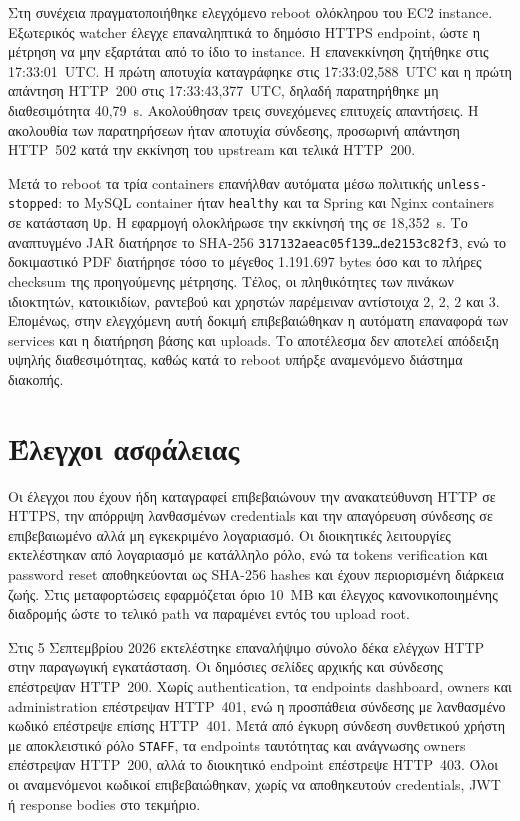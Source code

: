 Στη συνέχεια πραγματοποιήθηκε ελεγχόμενο reboot ολόκληρου του EC2 instance.
Εξωτερικός watcher έλεγχε επαναληπτικά το δημόσιο HTTPS endpoint, ώστε η
μέτρηση να μην εξαρτάται από το ίδιο το instance. Η επανεκκίνηση ζητήθηκε στις
17:33:01~UTC. Η πρώτη αποτυχία καταγράφηκε στις 17:33:02,588~UTC και η πρώτη
απάντηση HTTP~200 στις 17:33:43,377~UTC, δηλαδή παρατηρήθηκε μη διαθεσιμότητα
40,79~s. Ακολούθησαν τρεις συνεχόμενες επιτυχείς απαντήσεις. Η ακολουθία των
παρατηρήσεων ήταν αποτυχία σύνδεσης, προσωρινή απάντηση HTTP~502 κατά την
εκκίνηση του upstream και τελικά HTTP~200.

Μετά το reboot τα τρία containers επανήλθαν αυτόματα μέσω πολιτικής
\texttt{unless-stopped}: το MySQL container ήταν \texttt{healthy} και τα
Spring και Nginx containers σε κατάσταση \texttt{Up}. Η εφαρμογή ολοκλήρωσε
την εκκίνησή της σε 18,352~s. Το αναπτυγμένο JAR διατήρησε το SHA-256
\texttt{317132aeac05f139\ldots de2153c82f3}, ενώ το δοκιμαστικό PDF διατήρησε
τόσο το μέγεθος 1.191.697 bytes όσο και το πλήρες checksum της προηγούμενης
μέτρησης. Τέλος, οι πληθικότητες των πινάκων ιδιοκτητών, κατοικιδίων, ραντεβού
και χρηστών παρέμειναν αντίστοιχα 2, 2, 2 και 3. Επομένως, στην ελεγχόμενη αυτή
δοκιμή επιβεβαιώθηκαν η αυτόματη επαναφορά των services και η διατήρηση βάσης
και uploads. Το αποτέλεσμα δεν αποτελεί απόδειξη υψηλής διαθεσιμότητας,
καθώς κατά το reboot υπήρξε αναμενόμενο διάστημα διακοπής.

\section{Έλεγχοι ασφάλειας}
Οι έλεγχοι που έχουν ήδη καταγραφεί επιβεβαιώνουν την ανακατεύθυνση HTTP σε
HTTPS, την απόρριψη λανθασμένων credentials και την απαγόρευση σύνδεσης σε
επιβεβαιωμένο αλλά μη εγκεκριμένο λογαριασμό. Οι διοικητικές λειτουργίες
εκτελέστηκαν από λογαριασμό με κατάλληλο ρόλο, ενώ τα tokens verification και
password reset αποθηκεύονται ως SHA-256 hashes και έχουν περιορισμένη διάρκεια
ζωής. Στις μεταφορτώσεις εφαρμόζεται όριο 10~MB και έλεγχος κανονικοποιημένης
διαδρομής ώστε το τελικό path να παραμένει εντός του upload root.

Στις 5 Σεπτεμβρίου 2026 εκτελέστηκε επαναλήψιμο σύνολο δέκα ελέγχων HTTP στην
παραγωγική εγκατάσταση. Οι δημόσιες σελίδες αρχικής και σύνδεσης επέστρεψαν
HTTP~200. Χωρίς authentication, τα endpoints dashboard, owners και
administration επέστρεψαν HTTP~401, ενώ η προσπάθεια σύνδεσης με λανθασμένο
κωδικό επέστρεψε επίσης HTTP~401. Μετά από έγκυρη σύνδεση συνθετικού χρήστη
με αποκλειστικό ρόλο \texttt{STAFF}, τα endpoints ταυτότητας και ανάγνωσης
owners επέστρεψαν HTTP~200, αλλά το διοικητικό endpoint επέστρεψε HTTP~403.
Όλοι οι αναμενόμενοι κωδικοί επιβεβαιώθηκαν, χωρίς να αποθηκευτούν
credentials, JWT ή response bodies στο τεκμήριο.

